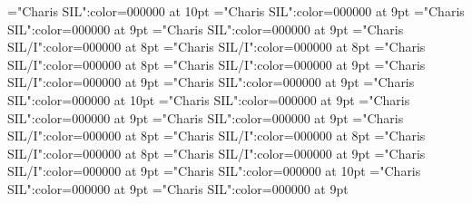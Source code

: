 \documentclass[gps1,twoside]{article}
\begin{document}
\font\xitemhiLexSensepublishStemGlossPubLdtesensespanentryletDatadicBody="Charis SIL":color=000000 at 10pt
\font\spanhixitemhiLexSensepublishStemGlossPubLdtesensespanentryletDatadicBody="Charis SIL":color=000000 at 9pt
\font\spansensespanentryletDatadicBody="Charis SIL":color=000000 at 9pt
\font\spanspansensespanentryletDatadicBody="Charis SIL":color=000000 at 9pt
\font\exampleggoTeluINspanspansensespanentryletDatadicBody="Charis SIL/I":color=000000 at 8pt
\font\examplebeforespanspansensespanentryletDatadicBody="Charis SIL/I":color=000000 at 8pt
\font\exampleafterspanspansensespanentryletDatadicBody="Charis SIL/I":color=000000 at 8pt
\font\spanggoTeluINexampleggoTeluINspanspansensespanentryletDatadicBody="Charis SIL/I":color=000000 at 9pt
\font\spanenexampleggoTeluINspanspansensespanentryletDatadicBody="Charis SIL/I":color=000000 at 9pt
\font\spanspanspansensespanentryletDatadicBody="Charis SIL":color=000000 at 9pt
\font\translationLdtespanspanspansensespanentryletDatadicBody="Charis SIL":color=000000 at 10pt
\font\spantetranslationLdtespanspanspansensespanentryletDatadicBody="Charis SIL":color=000000 at 9pt
\font\spanentranslationLdtespanspanspansensespanentryletDatadicBody="Charis SIL":color=000000 at 9pt
\font\spanenspansensespanentryletDatadicBody="Charis SIL":color=000000 at 9pt
\font\exampleggoTeluINspansensespanentryletDatadicBody="Charis SIL/I":color=000000 at 8pt
\font\examplebeforespansensespanentryletDatadicBody="Charis SIL/I":color=000000 at 8pt
\font\exampleafterspansensespanentryletDatadicBody="Charis SIL/I":color=000000 at 8pt
\font\spanggoTeluINexampleggoTeluINspansensespanentryletDatadicBody="Charis SIL/I":color=000000 at 9pt
\font\spanenexampleggoTeluINspansensespanentryletDatadicBody="Charis SIL/I":color=000000 at 9pt
\font\translationLdtespanspansensespanentryletDatadicBody="Charis SIL":color=000000 at 10pt
\font\spantetranslationLdtespanspansensespanentryletDatadicBody="Charis SIL":color=000000 at 9pt
\font\spanentranslationLdtespanspansensespanentryletDatadicBody="Charis SIL":color=000000 at 9pt
\end{document}
